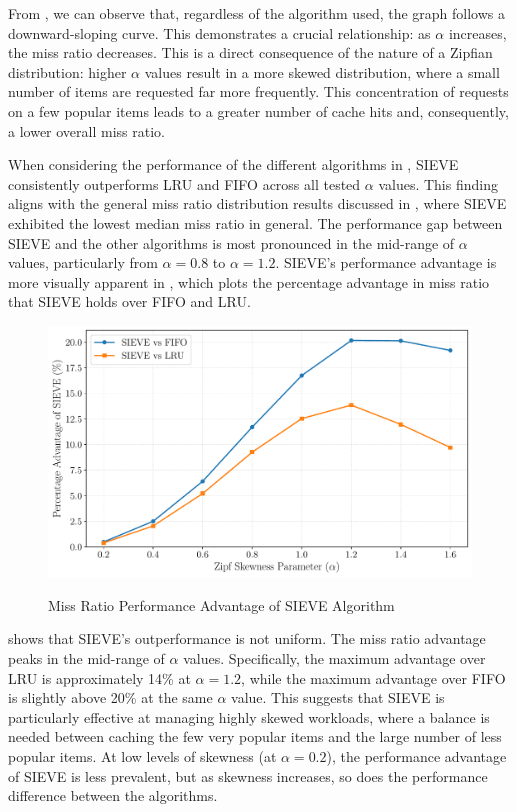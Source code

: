 From , we can observe that, regardless of the algorithm used, the graph follows a downward-sloping curve. This demonstrates a crucial relationship: as $\alpha$ increases, the miss ratio decreases. This is a direct consequence of the nature of a Zipfian distribution: higher $\alpha$ values result in a more skewed distribution, where a small number of items are requested far more frequently. This concentration of requests on a few popular items leads to a greater number of cache hits and, consequently, a lower overall miss ratio.

When considering the performance of the different algorithms in , SIEVE consistently outperforms LRU and FIFO across all tested $\alpha$ values. This finding aligns with the general miss ratio distribution results discussed in , where SIEVE exhibited the lowest median miss ratio in general. The performance gap between SIEVE and the other algorithms is most pronounced in the mid-range of $\alpha$ values, particularly from $\alpha=0.8$ to $\alpha=1.2$. SIEVE's performance advantage is more visually apparent in , which plots the percentage advantage in miss ratio that SIEVE holds over FIFO and LRU.

\begin{figure}[h!]
    \centering
    \caption{Miss Ratio Performance Advantage of SIEVE Algorithm}
    \includegraphics[width=0.8\linewidth]{figures/simulations/sieve_advantage_no_title.pdf}
    \label{fig:sieve-advantage}
\end{figure}

 shows that SIEVE's outperformance is not uniform. The miss ratio advantage peaks in the mid-range of $\alpha$ values. Specifically, the maximum advantage over LRU is approximately 14\% at $\alpha=1.2$, while the maximum advantage over FIFO is slightly above 20\% at the same $\alpha$ value. This suggests that SIEVE is particularly effective at managing highly skewed workloads, where a balance is needed between caching the few very popular items and the large number of less popular items. At low levels of skewness (at $\alpha=0.2$), the performance advantage of SIEVE is less prevalent, but as skewness increases, so does the performance difference between the algorithms.


